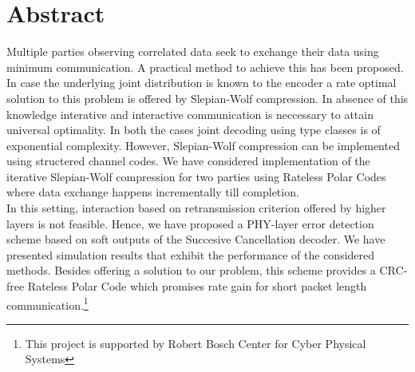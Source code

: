 \documentclass[
11pt, %
a4paper, %
oneside, %
headinclude,footinclude, %
BCOR5mm, %
]{scrartcl}
\begin{document}
\newpage


\setcounter{tocdepth}{2} %

\tableofcontents %
\newpage
\listoffigures

\newpage
\section*{Abstract}
Multiple parties observing correlated data seek to exchange their data using minimum communication. A practical method to achieve this has been proposed. \\In case the underlying joint distribution is known to the encoder a rate optimal solution to this problem is offered by Slepian-Wolf compression. In absence of this knowledge interative and interactive communication is neccessary to attain universal optimality. In both the cases joint decoding using type classes is of exponential complexity. However, Slepian-Wolf compression can be implemented using structered channel codes. We have considered implementation of the iterative Slepian-Wolf compression for two parties using Rateless Polar Codes where data exchange happens incrementally till completion. \\In this setting, interaction based on retransmission criterion offered by higher layers is not feasible.
Hence, we have  proposed a PHY-layer error detection scheme based on soft outputs of the Succesive Cancellation decoder. We have presented simulation results that exhibit the performance of the considered methods.
Besides offering a solution to our problem, this scheme provides a CRC-free Rateless Polar Code which promises rate gain for short packet length communication.\footnote{This project is supported by Robert Bosch Center for Cyber Physical Systems}
 
\newpage
\end{document}

